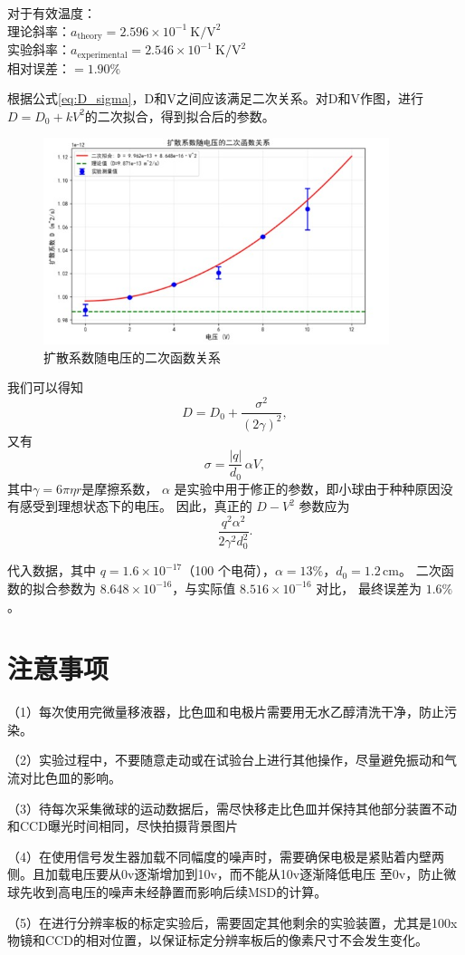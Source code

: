 \documentclass[a4paper]{report} %
\begin{document}
对于有效温度：\\
理论斜率：$a_{\text{theory}} = 2.596 \times 10^{-1} \ \text{K}/\text{V}^2$ \\ 
实验斜率：$a_{\text{experimental}} = 2.546 \times 10^{-1} \ \text{K}/\text{V}^2$ \\ 
相对误差：$= 1.90\%$\par
根据公式\eqref{eq:D_sigma}，D和V之间应该满足二次关系。对D和V作图，进行$D = D_0 + kV^2$的二次拟合，得到拟合后的参数。
\begin{figure}[H]
    \centering
    \includegraphics[width=0.9\textwidth]{二次拟合.jpg}
    \caption{扩散系数随电压的二次函数关系}
    \label{fig:fit2V}
\end{figure}
我们可以得知
\begin{equation}
    D = D_0 + \frac{\sigma^2}{(2\gamma)^2},
\end{equation}
又有
\begin{equation}
    \sigma = \frac{|q|}{d_0}\,\alpha V,
\end{equation}
其中$\gamma = 6 \pi \eta r$是摩擦系数， $\alpha$ 是实验中用于修正的参数，即小球由于种种原因没有感受到理想状态下的电压。  
因此，真正的 $D\!-\!V^2$ 参数应为
\begin{equation}
    \frac{q^2 \alpha^2}{2 \gamma^2 d_0^2}.
\end{equation}

代入数据，其中 $q = 1.6\times 10^{-17}$（100 个电荷），$\alpha = 13\%$，$d_0 = 1.2\,\mathrm{cm}$。  
二次函数的拟合参数为 $8.648\times 10^{-16}$，与实际值 $8.516\times 10^{-16}$ 对比，  
最终误差为 $1.6\%$。
\newpage
\section{注意事项}
（1）每次使用完微量移液器，比色皿和电极片需要用无水乙醇清洗干净，防止污染。\par
（2）实验过程中，不要随意走动或在试验台上进行其他操作，尽量避免振动和气流对比色皿的影响。\par
（3）待每次采集微球的运动数据后，需尽快移走比色皿并保持其他部分装置不动和CCD曝光时间相同，尽快拍摄背景图片 \par
（4）在使用信号发生器加载不同幅度的噪声时，需要确保电极是紧贴着内壁两侧。且加载电压要从0v逐渐增加到10v，而不能从10v逐渐降低电压
至0v，防止微球先收到高电压的噪声未经静置而影响后续MSD的计算。\par
（5）在进行分辨率板的标定实验后，需要固定其他剩余的实验装置，尤其是100x物镜和CCD的相对位置，以保证标定分辨率板后的像素尺寸不会发生变化。\par
\end{document}
